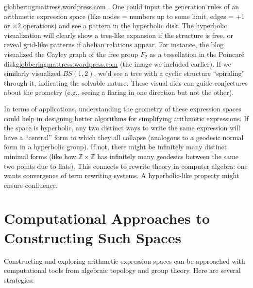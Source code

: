 \documentclass[11pt]{article}
\theoremstyle{remark}
\begin{document}
\href{https://globberingmattress.wordpress.com/2017/12/26/deck-transformations-revisted/#:~:text=However%2C%20there%20is%20one%20setting,also%20an%20exponentially%20growing%20graph}{globberingmattress.wordpress.com}
. One could input the generation rules of an arithmetic expression space (like nodes = numbers up to some limit, edges = +1 or ×2 operations) and see a pattern in the hyperbolic disk. The hyperbolic visualization will clearly show a tree-like expansion if the structure is free, or reveal grid-like patterns if abelian relations appear. For instance, the blog visualized the Cayley graph of the free group $F_2$ as a tessellation in the Poincaré disk\href{https://globberingmattress.wordpress.com/2017/12/26/deck-transformations-revisted/#:~:text=The%20covering%20space%20looked%20like,the%20nodes%20that%20connect%20them}{globberingmattress.wordpress.com}
 (the image we included earlier). If we similarly visualized $BS(1,2)$, we’d see a tree with a cyclic structure “spiraling” through it, indicating the solvable nature. These visual aids can guide conjectures about the geometry (e.g., seeing a flaring in one direction but not the other).

In terms of applications, understanding the geometry of these expression spaces could help in designing better algorithms for simplifying arithmetic expressions. If the space is hyperbolic, any two distinct ways to write the same expression will have a “central” form to which they all collapse (analogous to a geodesic normal form in a hyperbolic group). If not, there might be infinitely many distinct minimal forms (like how $\mathbb{Z}\times \mathbb{Z}$ has infinitely many geodesics between the same two points due to flats). This connects to rewrite theory in computer algebra: one wants convergence of term rewriting systems. A hyperbolic-like property might ensure confluence.

\section*{Computational Approaches to Constructing Such Spaces}
Constructing and exploring arithmetic expression spaces can be approached with computational tools from algebraic topology and group theory. Here are several strategies:
\end{document}
